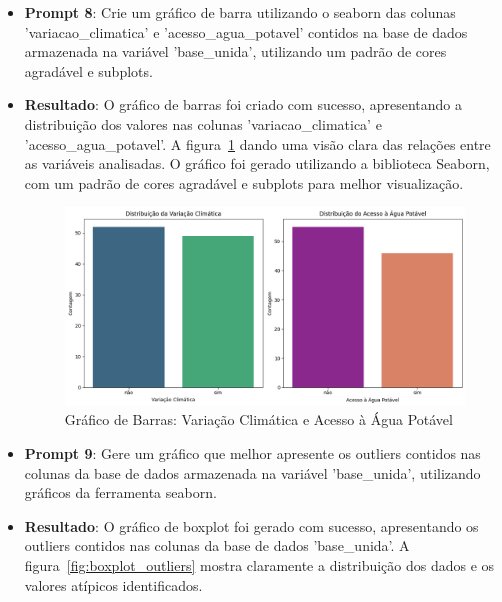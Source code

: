 \documentclass[12pt, a4paper, onecolumn]{article}
\begin{document}
\begin{itemize}
        \item \textbf{Prompt 8}: Crie um gráfico de barra utilizando o seaborn das colunas 'variacao\_climatica' e 'acesso\_agua\_potavel' contidos na base de dados armazenada na variável 'base\_unida', utilizando um padrão de cores agradável e subplots.
        
        \item \textbf{Resultado}: O gráfico de barras foi criado com sucesso, apresentando a distribuição dos valores nas colunas 'variacao\_climatica' e 'acesso\_agua\_potavel'. A figura~\ref{fig:grafico_dados_binarios_tratados} dando uma visão clara das relações entre as variáveis analisadas. O gráfico foi gerado utilizando a biblioteca Seaborn, com um padrão de cores agradável e subplots para melhor visualização.
        
        \begin{figure}[htbp]
            \centering
            \includegraphics[width=1\textwidth]{figures/grafico_dados_binarios_tratados.png}
            \caption{Gráfico de Barras: Variação Climática e Acesso à Água Potável}
            \label{fig:grafico_dados_binarios_tratados} 
        \end{figure}

        \item \textbf{Prompt 9}: Gere um gráfico que melhor apresente os outliers contidos nas colunas da base de dados armazenada na variável 'base\_unida', utilizando gráficos da ferramenta seaborn.
        
        \item \textbf{Resultado}: O gráfico de boxplot foi gerado com sucesso, apresentando os outliers contidos nas colunas da base de dados 'base\_unida'. A figura~\ref{fig:boxplot_outliers} mostra claramente a distribuição dos dados e os valores atípicos identificados.
        

\end{itemize}
\end{document}
